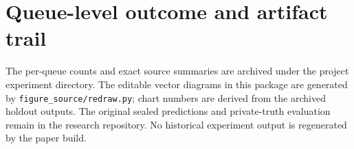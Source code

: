 \section{Queue-level outcome and artifact trail}
The per-queue counts and exact source summaries are archived under the project experiment directory. The editable vector diagrams in this package are generated by \texttt{figure\_source/redraw.py}; chart numbers are derived from the archived holdout outputs. The original sealed predictions and private-truth evaluation remain in the research repository. No historical experiment output is regenerated by the paper build.
